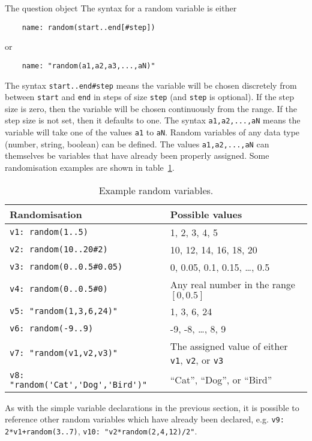 \begin{chapter}{\label{cha:question_object}The question object}
  The syntax for a random variable is either
  \begin{Verbatim}
    name: random(start..end[#step])
  \end{Verbatim}
  or
  \begin{Verbatim}
    name: "random(a1,a2,a3,...,aN)"
  \end{Verbatim}
  The syntax \verb"start..end#step" means the variable will be chosen
  discretely from between \verb"start" and \verb"end" in steps of size
  \verb"step" (and \verb"step" is optional).  If the step size is zero, then
  the variable will be chosen continuously from the range.  If the step size is
  not set, then it defaults to one.  The syntax \verb"a1,a2,...,aN" means the
  variable will take one of the values \verb"a1" to \verb"aN".  Random
  variables of any data type (\eg number, string, boolean) can be defined.  The
  values \verb"a1,a2,...,aN" can themselves be variables that have already been
  properly assigned.  Some randomisation examples are shown in
  table~\ref{tab:randomisation}.
  \begin{table}[ht]
    \centering
    \begin{tabular}{lp{16em}}
      \hline
      Randomisation                  & Possible values \\
      \hline
      \verb'v1: random(1..5)'        & 1, 2, 3, 4, 5 \\
      \verb'v2: random(10..20#2)'    & 10, 12, 14, 16, 18, 20 \\
      \verb'v3: random(0..0.5#0.05)' & 0, 0.05, 0.1, 0.15, \ldots, 0.5 \\
      \verb'v4: random(0..0.5#0)'    & Any real number in the range $[0,0.5]$ \\
      \verb'v5: "random(1,3,6,24)"'  & 1, 3, 6, 24 \\
      \verb'v6: random(-9..9)'       & -9, -8, \ldots, 8, 9 \\
      \verb'v7: "random(v1,v2,v3)"'  & The assigned value of either \verb"v1",
      \verb"v2", or \verb"v3" \\
      \verb+v8: "random('Cat','Dog','Bird')"+ & ``Cat'', ``Dog'', or ``Bird''
      \\
      \hline\hline
    \end{tabular}
    \caption{\label{tab:randomisation}
      Example random variables.
    }
  \end{table}
  As with the simple variable declarations in the previous section, it is
  possible to reference other random variables which have already been
  declared, e.g. \verb"v9: 2*v1+random(3..7)", \verb'v10: "v2*random(2,4,12)/2"'.


\end{chapter}
